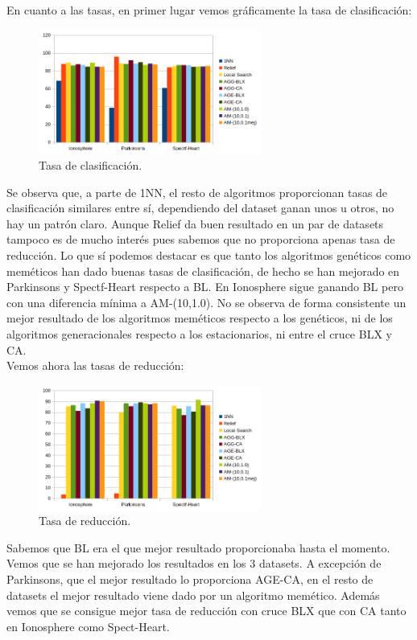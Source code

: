 \documentclass[11pt,a4paper]{article}
\theoremstyle{definition}
\begin{document}
	
		En cuanto a las tasas, en primer lugar vemos gráficamente la tasa de clasificación:
	
	\begin{figure}[H]
		\centering
		\includegraphics[width=0.65\textwidth]{images/tasa_clas.png}
		\caption{Tasa de clasificación.}
	\end{figure}

	Se observa que, a parte de 1NN, el resto de algoritmos proporcionan tasas de clasificación similares entre sí, dependiendo del dataset ganan unos u otros, no hay un patrón claro. Aunque Relief da buen resultado en un par de datasets tampoco es de mucho interés pues sabemos que no proporciona apenas tasa de reducción. Lo que sí podemos destacar es que tanto los algoritmos genéticos como meméticos han dado buenas tasas de clasificación, de hecho se han mejorado en Parkinsons y Spectf-Heart respecto a BL. En Ionosphere sigue ganando BL pero con una diferencia mínima a AM-(10,1.0). No se observa de forma consistente un mejor resultado de los algoritmos meméticos respecto a los genéticos, ni de los algoritmos generacionales respecto a los estacionarios, ni entre el cruce BLX y CA.~\\
	
	
	Vemos ahora las tasas de reducción:
	\begin{figure}[H]
		\centering
		\includegraphics[width=0.65\textwidth]{images/tasa_red.png}
		\caption{Tasa de reducción.}
	\end{figure}
	
	Sabemos que BL era el que mejor resultado proporcionaba hasta el momento. Vemos que se han mejorado los resultados en los 3 datasets. A excepción de Parkinsons, que el mejor resultado lo proporciona AGE-CA, en el resto de datasets el mejor resultado viene dado por un algoritmo memético. Además vemos que se consigue mejor tasa de reducción con cruce BLX que con CA tanto en Ionosphere como Spect-Heart.~\\
	
\end{document}
